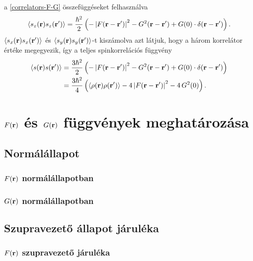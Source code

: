 \documentclass[a4paper,12pt,titlepage]{article}
\newcommand{\RR}{{\vb{r}}}
\begin{document}
a \eqref{correlators-F-G} összefüggéseket felhasználva
\begin{equation}
	\left< s_z(\RR) s_z(\RR^\prime) \right> = \frac{\hbar^2}{2} \left( -\left| F(\RR - \RR^\prime) \right|^2 - G^2(\RR - \RR^\prime) + G(0) \cdot \delta(\RR - \RR^\prime) \right).
\end{equation}
$\left< s_x(\RR) s_x(\RR^\prime) \right>$ és $\left< s_y(\RR) s_y(\RR^\prime) \right>$-t kiszámolva azt látjuk, hogy a három korrelátor értéke megegyezik, így a teljes spinkorrelációs függvény
\begin{equation}
\begin{split}
	\left< s(\RR) s(\RR^\prime) \right> & = \frac{3 \hbar^2}{2} \left( -\left| F(\RR - \RR^\prime) \right|^2 - G^2(\RR - \RR^\prime) + G(0) \cdot \delta(\RR - \RR^\prime) \right) \\
	& = \frac{3 \hbar^2}{4} \left( \left< \rho(\RR) \rho(\RR^\prime) \right> - 4 \left| F(\RR - \RR^\prime) \right|^2 - 4 \, G^2(0) \right).
\end{split}
\end{equation}


\section{$F(\RR)$ és $G(\RR)$ függvények meghatározása}

\subsection{Normálállapot}

\subsubsection{$F(\RR)$ normálállapotban}
\subsubsection{$G(\RR)$ normálállapotban}

\subsection{Szupravezető állapot járuléka}

\subsubsection{$F(\RR)$ szupravezető járuléka}
\end{document}

